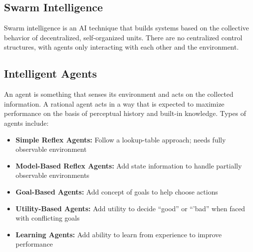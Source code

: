 \documentclass[12pt,titlepage]{article}
\begin{document}
    \subsection{Swarm Intelligence}
      Swarm intelligence is an AI technique that builds systems based on the collective behavior of decentralized, self-organized units.
      There are no centralized control structures, with agents only interacting with each other and the environment.

    \subsection{Intelligent Agents}
      An agent is something that senses its environment and acts on the collected information. A rational agent acts in a way that is
      expected to maximize performance on the basis of perceptual history and built-in knowledge. Types of agents include:
      \begin{itemize}
        \item \textbf{Simple Reflex Agents:} Follow a lookup-table approach; needs fully observable environment
        \item \textbf{Model-Based Reflex Agents:} Add state information to handle partially observable environments
        \item \textbf{Goal-Based Agents:} Add concept of goals to help choose actions
        \item \textbf{Utility-Based Agents:} Add utility to decide ``good'' or ``'bad'' when faced with conflicting goals
        \item \textbf{Learning Agents:} Add ability to learn from experience to improve performance
      \end{itemize}
\end{document}

